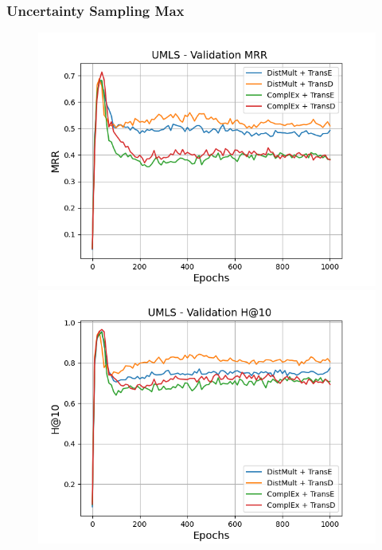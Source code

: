 \subsubsection{Uncertainty Sampling Max}
\begin{figure}[H]
    \centering
    \begin{minipage}{.5\textwidth}
      \centering
      \includegraphics[width=\linewidth]{figures/results/gan_train/not_pretrained/uncertainty/max/entropy/umls/1k_epochs/uncertainty_umls_mrrs.png}
    \end{minipage}%
    \begin{minipage}{.5\textwidth}
      \centering
      \includegraphics[width=\linewidth]{figures/results/gan_train/not_pretrained/uncertainty/max/entropy/umls/1k_epochs/uncertainty_umls_hit10.png}
    \end{minipage}
    

\end{figure}

